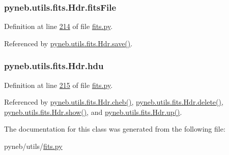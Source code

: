 \hypertarget{classpyneb_1_1utils_1_1fits_1_1_hdr_a7c4dc491907edb52649262563df2e23c}{}
\subsubsection[{fits\+File}]{\setlength{\rightskip}{0pt plus 5cm}pyneb.\+utils.\+fits.\+Hdr.\+fits\+File}\label{classpyneb_1_1utils_1_1fits_1_1_hdr_a7c4dc491907edb52649262563df2e23c}


Definition at line \hyperlink{fits_8py_source_l00214}{214} of file \hyperlink{fits_8py_source}{fits.\+py}.



Referenced by \hyperlink{fits_8py_source_l00263}{pyneb.\+utils.\+fits.\+Hdr.\+save()}.

\hypertarget{classpyneb_1_1utils_1_1fits_1_1_hdr_a23de98701ac30e7c56654f92d9956fca}{}
\subsubsection[{hdu}]{\setlength{\rightskip}{0pt plus 5cm}pyneb.\+utils.\+fits.\+Hdr.\+hdu}\label{classpyneb_1_1utils_1_1fits_1_1_hdr_a23de98701ac30e7c56654f92d9956fca}


Definition at line \hyperlink{fits_8py_source_l00215}{215} of file \hyperlink{fits_8py_source}{fits.\+py}.



Referenced by \hyperlink{fits_8py_source_l00232}{pyneb.\+utils.\+fits.\+Hdr.\+cheb()}, \hyperlink{fits_8py_source_l00228}{pyneb.\+utils.\+fits.\+Hdr.\+delete()}, \hyperlink{fits_8py_source_l00219}{pyneb.\+utils.\+fits.\+Hdr.\+show()}, and \hyperlink{fits_8py_source_l00223}{pyneb.\+utils.\+fits.\+Hdr.\+up()}.



The documentation for this class was generated from the following file\+:\begin{DoxyCompactItemize}
\item 
pyneb/utils/\hyperlink{fits_8py}{fits.\+py}\end{DoxyCompactItemize}
